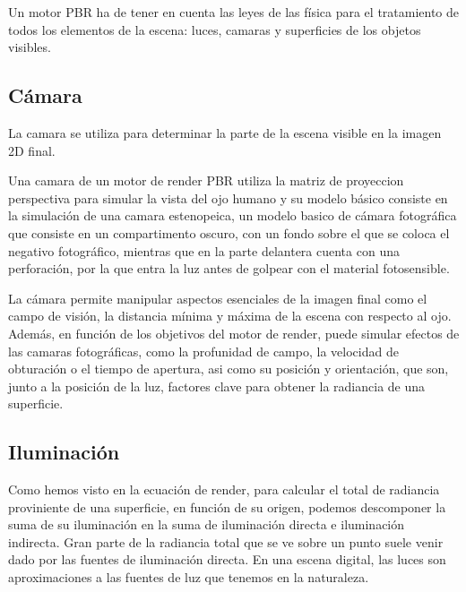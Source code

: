     Un motor PBR ha de tener en cuenta las leyes de las f\'isica para el tratamiento de todos los elementos de la escena: luces, camaras
    y superficies de los objetos visibles.

    \subsection{C\'amara}
    La camara se utiliza para determinar la parte de la escena visible en la imagen 2D final.

    Una camara de un motor de render PBR utiliza la matriz de proyeccion perspectiva para simular la
    vista del ojo humano y su modelo b\'asico consiste en la simulaci\'on de una camara estenopeica, un modelo basico de c\'amara fotogr\'afica que
    consiste en un compartimento oscuro, con un fondo sobre el que se coloca el negativo fotogr\'afico, mientras que en la parte delantera cuenta
    con una perforaci\'on, por la que entra la luz antes de golpear con el material fotosensible.

    La c\'amara permite manipular aspectos esenciales de la imagen final como el campo de visi\'on, la distancia m\'inima y m\'axima de la escena
    con respecto al ojo. Adem\'as, en funci\'on de los objetivos del motor de render, puede simular efectos de las camaras fotogr\'aficas, como la
    profunidad de campo, la velocidad de obturaci\'on o el tiempo de apertura, asi como su posici\'on y orientaci\'on, que son, junto a la posici\'on
    de la luz, factores clave para obtener la radiancia de una superficie.

    \subsection{Iluminaci\'on}
        Como hemos visto en la ecuaci\'on de render, para calcular el total de radiancia proviniente de una superficie, en funci\'on de
        su origen, podemos descomponer la suma de su iluminaci\'on en la suma de iluminaci\'on directa e iluminaci\'on indirecta.
        Gran parte de la radiancia total que se ve sobre un punto suele venir dado por las fuentes de iluminaci\'on directa. En una escena digital,
        las luces son aproximaciones a las fuentes de luz que tenemos en la naturaleza.
        

